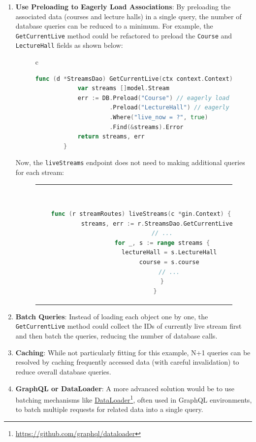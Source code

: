\begin{enumerate}
    \item \textbf{Use Preloading to Eagerly Load Associations}: By preloading the associated data (courses and lecture halls) in a single query, the number of database queries can be reduced to a minimum. For example, the \texttt{GetCurrentLive} method could be refactored to preload the \texttt{Course} and \texttt{LectureHall} fields as shown below:

    \begin{figure}[htpb]
      \begin{tabular}{c}
      \ \small \begin{lstlisting}[language=Go]
        func (d *StreamsDao) GetCurrentLive(ctx context.Context) ([]model.Stream, error) {
            var streams []model.Stream
            err := DB.Preload("Course") // eagerly load stream's course
                     .Preload("LectureHall") // eagerly load stream's lecturehalls
                     .Where("live_now = ?", true)
                     .Find(&streams).Error
            return streams, err
        }
      \end{lstlisting}
      \end{tabular}
    \end{figure}

        Now, the \texttt{liveStreams} endpoint does not need to making additional queries for each stream:
    
    \begin{figure}[htpb]
      \begin{tabular}{c}
      \ \small \begin{lstlisting}[language=Go]
        func (r streamRoutes) liveStreams(c *gin.Context) {
            streams, err := r.StreamsDao.GetCurrentLive(c)
            // ...
            for _, s := range streams {
                lectureHall = s.LectureHall
                course = s.course
                // ...
            }
        }
      \end{lstlisting}
      \end{tabular}
    \end{figure}

    \item \textbf{Batch Queries}: Instead of loading each object one by one, the \texttt{GetCurrentLive} method could collect the IDs of currently live stream first and then batch the queries, reducing the number of database calls.

    \item \textbf{Caching}: While not particularly fitting for this example, N+1 queries can be resolved by caching frequently accessed data (with careful invalidation) to reduce overall database queries.

    \item \textbf{GraphQL or DataLoader}: A more advanced solution would be to use batching mechanisms like \href{https://github.com/graphql/dataloader}{DataLoader}\footnote{\url{https://github.com/graphql/dataloader}}, often used in GraphQL environments, to batch multiple requests for related data into a single query.
\end{enumerate}


